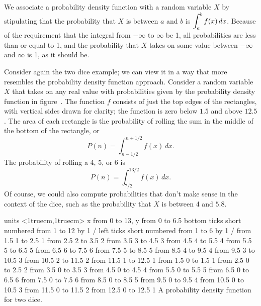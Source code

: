 We associate a probability density
function with a random variable $X$ by stipulating that the
probability that $X$ is between $a$ and $b$ is 
$\displaystyle\int_a^b f(x)\,dx$. Because of the requirement that the integral
from $-\infty$ to $\infty$ be 1, all probabilities are less than or
equal to 1, and 
the probability that $X$ takes on some value
between $-\infty$ and $\infty$ is 1, as it should be.

\example Consider again the two dice example; we can view it in a way
that more resembles the probability density function
approach. Consider a random variable $X$ that takes on any real value
with probabilities given by the probability density function in
figure~. The function $f$ consists of just the top
edges of the rectangles, with vertical sides drawn for clarity; the
function is zero below $1.5$ and above $12.5$.
The area of each rectangle is the probability of rolling the sum in
the middle of the bottom of the rectangle, or
$$P(n) = \int_{n-1/2}^{n+1/2} f(x)\,dx.$$
The probability of rolling a 4, 5, or 6 is
$$P(n) = \int_{7/2}^{13/2} f(x)\,dx.$$
Of course, we could also compute probabilities that don't make sense
in the context of the dice, such as the probability that 
$X$ is between 4 and $5.8$.
\endexample

\figure
\texonly
\vbox{\beginpicture
\normalgraphs
\ninepoint
\setcoordinatesystem units <1truecm,1truecm>
\setplotarea x from 0 to 13, y from 0 to 6.5
\axis bottom ticks short numbered from 1 to 12 by 1 /
\axis left ticks short numbered from 1 to 6 by 1 /
\putrule from 1.5 1 to 2.5 1
\putrule from 2.5 2 to 3.5 2
\putrule from 3.5 3 to 4.5 3
\putrule from 4.5 4 to 5.5 4
\putrule from 5.5 5 to 6.5 5
\putrule from 6.5 6 to 7.5 6
\putrule from 7.5 5 to 8.5 5
\putrule from 8.5 4 to 9.5 4
\putrule from 9.5 3 to 10.5 3
\putrule from 10.5 2 to 11.5 2
\putrule from 11.5 1 to 12.5 1
\putrule from 1.5   0 to 1.5  1
\putrule from 2.5   0 to 2.5  2
\putrule from 3.5   0 to 3.5  3
\putrule from 4.5   0 to 4.5  4
\putrule from 5.5   0 to 5.5  5
\putrule from 6.5   0 to 6.5  6
\putrule from 7.5   0 to 7.5  6
\putrule from 8.5   0 to 8.5  5
\putrule from 9.5   0 to 9.5  4
\putrule from 10.5  0 to 10.5 3
\putrule from 11.5  0 to 11.5 2
\putrule from 12.5  0 to 12.5 1
\endpicture}
\endtexonly
{}
\begincaption
A probability density function for two dice.
\endcaption
\endfigure


